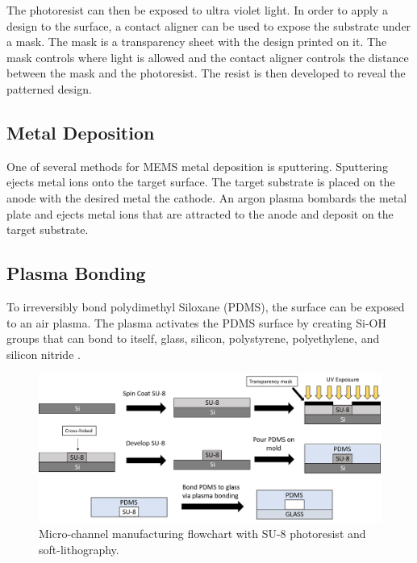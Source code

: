  \par The photoresist can then be exposed to ultra violet light. In order to apply a design to the surface, a contact aligner can be used to expose the substrate under a mask. The mask is a transparency sheet with the design printed on it. The mask controls where light is allowed and the contact aligner controls the distance between the mask and the photoresist. The resist is then developed to reveal the patterned design. 
 
 \subsection*{Metal Deposition}
 
 \par One of several methods for MEMS metal deposition is sputtering. Sputtering ejects metal ions onto the target surface. The target substrate is placed on the anode with the desired metal the cathode. An argon plasma bombards the metal plate and ejects metal ions that are attracted to the anode and deposit on the target substrate. 
 
 \subsection*{Plasma Bonding}
 
 \par To irreversibly bond polydimethyl Siloxane (PDMS), the surface can be exposed to an air plasma. The plasma activates the PDMS surface by creating Si-OH groups that can bond to itself, glass, silicon, polystyrene, polyethylene, and silicon nitride \cite{mcdonald_polydimethylsiloxane_2002-1}.

 \begin{figure}[h]
     \centering
     \includegraphics[width=\textwidth]{images/softLithography.png}
     \caption{Micro-channel manufacturing flowchart with SU-8 photoresist and soft-lithography.}
     \label{fig:soft_lithography}
 \end{figure}
 
